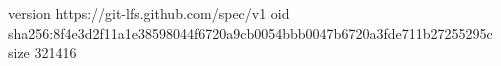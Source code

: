 version https://git-lfs.github.com/spec/v1
oid sha256:8f4e3d2f11a1e38598044f6720a9cb0054bbb0047b6720a3fde711b27255295c
size 321416
